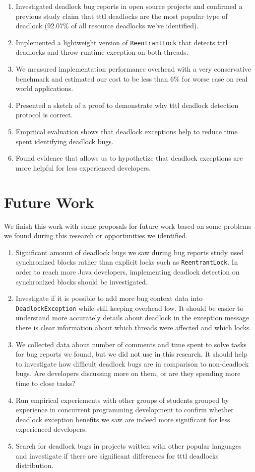 \begin{enumerate}
\item Investigated deadlock bug reports in open source projects and confirmed a previous study claim that \ac{tttl} deadlocks are the most popular type of deadlock (92.07\% of all resource deadlocks we've identified).
\item Implemented a lightweight version of {\tt ReentrantLock} that detects \ac{tttl} deadlocks and throw runtime exception on both threads.
\item We measured implementation performance overhead with a very conservative benchmark and estimated our cost to be less than 6\% for worse case on real world applications.
\item Presented a sketch of a proof to demonstrate why \ac{tttl} deadlock detection protocol is correct.
\item Empriical evaluation shows that deadlock exceptions help to reduce time spent identifying deadlock bugs.
\item Found evidence that allows us to hypothetize that deadlock exceptions are more helpful for less experienced developers.
\end{enumerate}

\section{Future Work}

We finish this work with some proposals for future work based on some problems we found during this research or opportunities we identified.

\begin{enumerate}
\item 
Significant amount of deadlock bugs we saw during bug reports study used synchronized blocks rather than explicit locks such as {\tt ReentrantLock}.
In order to reach more Java developers, implementing deadlock detection on synchronized blocks should be investigated.
\item
Investigate if it is possible to add more bug context data into {\tt DeadlockException} while still keeping overhead low.
It should be easier to understand more accurately details about deadlock in the exception message there is clear information about which threads were affected and which locks.
\item
We collected data about number of comments and time spent to solve tasks for bug reports we found, but we did not use in this research.
It should help to investigate how difficult deadlock bugs are in comparison to non-deadlock bugs. Are developers discussing more on them, or are they spending more time to close tasks?
\item
Run empirical experiements with other groups of students grouped by experience in concurrent programming development
to confirm whether deadlock exception benefits we saw are indeed more significant for less experienced developers.
\item
Search for deadlock bugs in projects written with other popular languages and investigate if there are significant differences for \ac{tttl} deadlocks distribution.
\end{enumerate}

